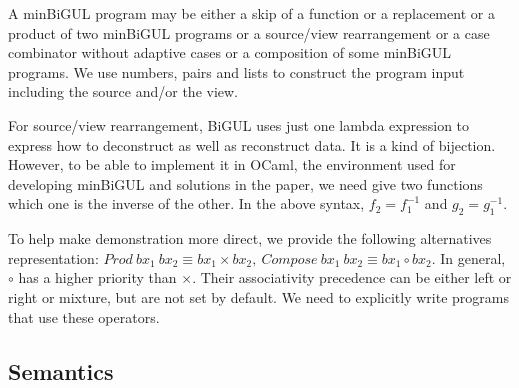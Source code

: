 A minBiGUL program may be either a skip of a function or a replacement or a product of two minBiGUL programs or a source/view rearrangement or a case combinator without adaptive cases or a composition of some minBiGUL programs. We use numbers, pairs and lists to construct the program input including the source and/or the view.

For source/view rearrangement, BiGUL uses just one lambda expression to express how to deconstruct as well as reconstruct data. It is a kind of bijection. However, to be able to implement it in OCaml, the environment used for developing minBiGUL and solutions in the paper, we need give two functions which one is the inverse of the other. In the above syntax, $f_2 = f_1^{-1}$ and $g_2 = g_1^{-1}$.

To help make demonstration more direct, we provide the following alternatives representation: $Prod \ bx_1 \ bx_2 \equiv bx_1 \times bx_2, \ Compose \ bx_1 \ bx_2 \equiv bx_1 \circ bx_2$. In general, $\circ$ has a higher priority than $\times$. Their associativity precedence can be either left or right or mixture, but are not set by default. We need to explicitly write programs that use these operators.

\subsection{Semantics}

